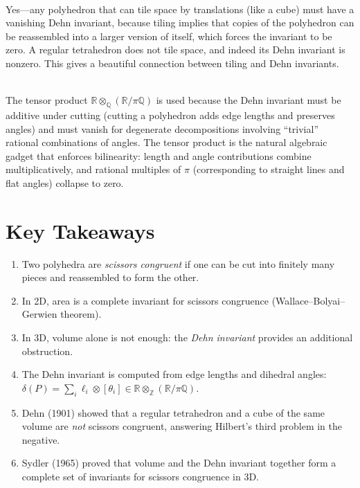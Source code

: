 \begin{description}[font=\bfseries, leftmargin=2em, style=nextline]
\item[Q: Does the Dehn invariant vanish for all polyhedra that tile space?]\hfill\\
Yes---any polyhedron that can tile space by translations (like a cube) must have a vanishing Dehn invariant, because tiling implies that copies of the polyhedron can be reassembled into a larger version of itself, which forces the invariant to be zero. A regular tetrahedron does not tile space, and indeed its Dehn invariant is nonzero. This gives a beautiful connection between tiling and Dehn invariants.

\item[Q: Why is the tensor product used in the definition of the Dehn invariant?]\hfill\\
The tensor product $\mathbb{R} \otimes_{\mathbb{Q}} (\mathbb{R}/\pi\mathbb{Q})$ is used because the Dehn invariant must be additive under cutting (cutting a polyhedron adds edge lengths and preserves angles) and must vanish for degenerate decompositions involving ``trivial'' rational combinations of angles. The tensor product is the natural algebraic gadget that enforces bilinearity: length and angle contributions combine multiplicatively, and rational multiples of $\pi$ (corresponding to straight lines and flat angles) collapse to zero.

\end{description}

\section*{Key Takeaways}

\begin{enumerate}
    \item Two polyhedra are \emph{scissors congruent} if one can be cut into finitely many pieces and reassembled to form the other.
    \item In 2D, area is a complete invariant for scissors congruence (Wallace--Bolyai--Gerwien theorem).
    \item In 3D, volume alone is not enough: the \emph{Dehn invariant} provides an additional obstruction.
    \item The Dehn invariant is computed from edge lengths and dihedral angles: $\delta(P) = \sum_i \ell_i \otimes [\theta_i] \in \mathbb{R} \otimes_{\mathbb{Z}} (\mathbb{R}/\pi\mathbb{Q})$.
    \item Dehn (1901) showed that a regular tetrahedron and a cube of the same volume are \emph{not} scissors congruent, answering Hilbert's third problem in the negative.
    \item Sydler (1965) proved that volume and the Dehn invariant together form a complete set of invariants for scissors congruence in 3D.
\end{enumerate}

